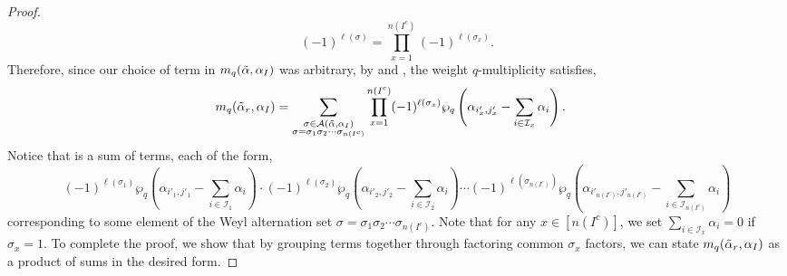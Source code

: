 \documentclass[10pt,a4paper]{amsart}
\newcommand{\hr}[0]{\Tilde{\alpha}}
\newcommand{\newmu}[0]{\alpha_I}
\newcommand{\qpartition}[1]{\wp_q\left(#1\right)}
\newcommand{\thealtset}[0]{\mathcal{A}(\hr,\newmu)}
\begin{document}
\begin{proof}
\begin{equation}
        (-1)^{\ell(\sigma)} = \prod_{x=1}^{n(I^c)}(-1)^{\ell(\sigma_x)}.\label{negative one stuff}
    \end{equation}
    Therefore, since our choice of term in $m_q(\hr,\alpha_I)$ was arbitrary, by  and , the weight $q$-multiplicity satisfies,
    \begin{align}
        m_q(\hr_r,\alpha_I) &= \sum_{\substack{\sigma\in\thealtset \\ \sigma=\sigma_1\sigma_2\cdots \sigma_{n(I^c)}}}\prod_{x=1}^{n(I^c)}(-1)^{\ell(\sigma_x)}\qpartition{\alpha_{i'_x,j'_x}-\sum_{i\in\mathcal{I}_x}\alpha_i}.\label{break into product 2}
    \end{align}
    Notice that  is a sum of terms, each of the form,
    \[(-1)^{\ell(\sigma_1)}\qpartition{\alpha_{i'_1,j'_1}-\sum_{i\in\mathcal{I}_1}\alpha_i}\cdot(-1)^{\ell(\sigma_2)}\qpartition{\alpha_{i'_2,j'_2}-\sum_{i\in\mathcal{I}_2}\alpha_i} \cdots (-1)^{\ell(\sigma_{n(I^c)})}\qpartition{\alpha_{i'_{n(I^c)},j'_{n(I^c)}}-\sum_{i\in\mathcal{I}_{n(I^c)}}\alpha_i} \]
    corresponding to some element of the Weyl alternation set $\sigma=\sigma_1\sigma_2\cdots\sigma_{n(I^c)}$. Note that for any $x\in[n(I^c)]$, we set $\sum_{i\in\mathcal{I}_x}\alpha_i=0$ if $\sigma_x=1$. To complete the proof, we show that by grouping terms together through factoring common $\sigma_x$ factors, we can state $m_q(\hr_r,\alpha_I)$ as a product of sums in the desired form. 
    

\end{proof}
\end{document}
